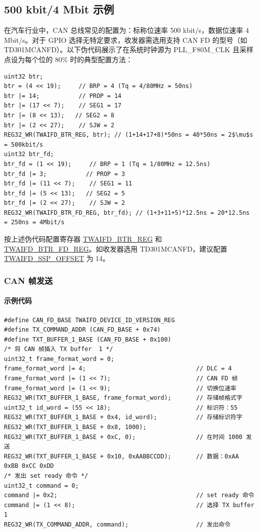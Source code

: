 \documentclass[main\_\_CN.tex]{subfiles}
\begin{document}
\subsection{500 kbit/4 Mbit 示例}
\label{sec:twai-prog-500-4-example}

在汽车行业中，CAN 总线常见的配置为：标称位速率 500 kbit/s，数据位速率 4 Mbit/s。对于 GPIO 选择无特定要求，收发器需选用支持 CAN FD 的型号（如 TD301MCANFD）。以下伪代码展示了在系统时钟源为 PLL\_F80M\_CLK 且采样点设为每个位的 80\% 时的典型配置方法：

\begin{lstlisting}[mathescape=true]
uint32 btr;
btr = (4 << 19);     // BRP = 4 (Tq = 4/80MHz = 50ns)
btr |= 14;           // PROP = 14
btr |= (17 << 7);    // SEG1 = 17
btr |= (8 << 13);   // SEG2 = 8
btr |= (2 << 27);    // SJW = 2
REG32_WR(TWAIFD_BTR_REG, btr); // (1+14+17+8)*50ns = 40*50ns = 2$\mu$s = 500kbit/s
uint32 btr_fd;
btr_fd = (1 << 19);     // BRP = 1 (Tq = 1/80MHz = 12.5ns)
btr_fd |= 3;           // PROP = 3
btr_fd |= (11 << 7);    // SEG1 = 11
btr_fd |= (5 << 13);   // SEG2 = 5
btr_fd |= (2 << 27);    // SJW = 2
REG32_WR(TWAIFD_BTR_FD_REG, btr_fd); // (1+3+11+5)*12.5ns = 20*12.5ns = 250ns = 4Mbit/s
\end{lstlisting}

按上述伪代码配置寄存器 \hyperref[regdesc:TWAIFDBTRREG]{TWAIFD\_BTR\_REG} 和 \hyperref[regdesc:TWAIFDBTRFDREG]{TWAIFD\_BTR\_FD\_REG}。如收发器选用 TD301MCANFD，建议配置 \hyperref[fielddesc:TWAIFDSSPOFFSET]{TWAIFD\_SSP\_OFFSET} 为 14。

\subsubsection{CAN 帧发送}\label{sec:twai-prog-can-frame-trans}

\paragraph{示例代码}
\begin{lstlisting}
#define CAN_FD_BASE TWAIFD_DEVICE_ID_VERSION_REG
#define TX_COMMAND_ADDR (CAN_FD_BASE + 0x74)
#define TXT_BUFFER_1_BASE (CAN_FD_BASE + 0x100)
/* 将 CAN 帧插入 TX buffer  1 */
uint32_t frame_format_word = 0;
frame_format_word |= 4;                               // DLC = 4
frame_format_word |= (1 << 7);                        // CAN FD 帧
frame_format_word |= (1 << 9);                        // 切换位速率
REG32_WR(TXT_BUFFER_1_BASE, frame_format_word);       // 存储帧格式字
uint32_t id_word = (55 << 18);                        // 标识符：55
REG32_WR(TXT_BUFFER_1_BASE + 0x4, id_word);           // 存储标识符字
REG32_WR(TXT_BUFFER_1_BASE + 0x8, 1000);
REG32_WR(TXT_BUFFER_1_BASE + 0xC, 0);                 // 在时间 1000 发送
REG32_WR(TXT_BUFFER_1_BASE + 0x10, 0xAABBCCDD);       // 数据：0xAA 0xBB 0xCC 0xDD
/* 发出 set ready 命令 */
uint32_t command = 0;
command |= 0x2;                                       // set ready 命令
command |= (1 << 8);                                  // 选择 TX buffer 1
REG32_WR(TX_COMMAND_ADDR, command);                   // 发出命令
\end{lstlisting}
\end{document}
